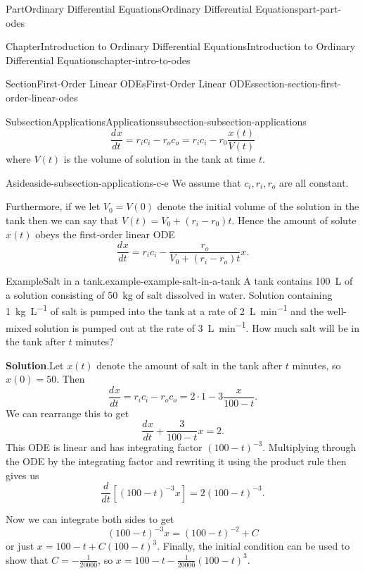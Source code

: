 \documentclass[twoside,10pt,]{book}
\newcommand{\blocktitlefont}{\relax}
\numberwithin{equation}{part}
\newcommand{\dv}[3][]{\dfrac{d^{#1} #2}{d #3^{#1}}}
\begin{document}
\begin{partptx}{Part}{Ordinary Differential Equations}{}{Ordinary Differential Equations}{}{}{part-part-odes}
\begin{chapterptx}{Chapter}{Introduction to Ordinary Differential Equations}{}{Introduction to Ordinary Differential Equations}{}{}{chapter-intro-to-odes}
\begin{sectionptx}{Section}{First-Order Linear ODEs}{}{First-Order Linear ODEs}{}{}{section-section-first-order-linear-odes}
\begin{subsectionptx}{Subsection}{Applications}{}{Applications}{}{}{subsection-subsection-applications}
\begin{equation*}
\dv{x}{t} = r_{i}c_{i} - r_{o}c_{o} = r_{i}c_{i} - r_{0}\frac{x(t)}{V(t)}
\end{equation*}
where \(V(t)\) is the volume of solution in the tank at time \(t\). \begin{aside}{Aside}{}{aside-subsection-applications-c-e}%
We assume that \(c_{i},r_{i},r_{o}\) are all constant.%
\end{aside}
 Furthermore, if we let \(V_{0} = V(0)\) denote the initial volume of the solution in the tank then we can say that \(V(t) = V_{0} + (r_{i}-r_{0})t.\) Hence the amount of solute \(x(t)\) obeys the first-order linear ODE%
\begin{equation*}
\dv{x}{t} = r_{i}c_{i} - \frac{r_{o}}{V_{0}+(r_{i}-r_{o})t}x.
\end{equation*}
%
\begin{example}{Example}{Salt in a tank.}{example-example-salt-in-a-tank}%
A tank contains \SI{100}{\liter} of a solution consisting of \SI{50}{\kilo\gram} of salt dissolved in water. Solution containing \SI{1}{\kilo\gram\per\liter} of salt is pumped into the tank at a rate of \SI{2}{\liter\per\minute} and the well-mixed solution is pumped out at the rate of \SI{3}{\liter\per\minute}. How much salt will be in the tank after \(t\) minutes?%
\par\smallskip%
\noindent\textbf{\blocktitlefont Solution}.\hypertarget{solution-example-salt-in-a-tank-c}{}\quad{}Let \(x(t)\) denote the amount of salt in the tank after \(t\) minutes, so \(x(0) = 50\). Then%
\begin{equation*}
\dv{x}{t} = r_{i}c_{i}-r_{o}c_{o} = 2\cdot1-3\frac{x}{100-t}.
\end{equation*}
We can rearrange this to get%
\begin{equation*}
\dv{x}{t} + \frac{3}{100-t}x = 2.
\end{equation*}
This ODE is linear and has integrating factor \((100-t)^{-3}\). Multiplying through the ODE by the integrating factor and rewriting it using the product rule then gives us%
\begin{equation*}
\dv{}{t}[(100-t)^{-3}x] = 2(100-t)^{-3}.
\end{equation*}
%
\par
Now we can integrate both sides to get%
\begin{equation*}
(100-t)^{-3}x = (100-t)^{-2}+C
\end{equation*}
or just \(x = 100-t+C(100-t)^{3}\). Finally, the initial condition can be used to show that \(C = -\frac{1}{20000}\), so \(x = 100-t - \frac{1}{20000}(100-t)^{3}\).%

\end{example}
\end{subsectionptx}
\end{sectionptx}
\end{chapterptx}
\end{partptx}
\end{document}
